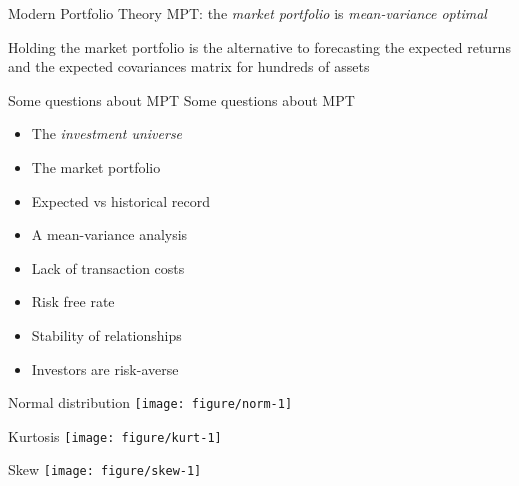 \documentclass[14pt,xcolor=pdftex,dvipsnames,table]{beamer}\usepackage[]{graphicx}\usepackage[]{color}
\makeatletter
\def\maxwidth{ %
  \ifdim\Gin@nat@width>\linewidth
    \linewidth
  \else
    \Gin@nat@width
  \fi
}
\newenvironment{knitrout}{}{} %
\makeatother
\begin{document}
\begin{frame}{Modern Portfolio Theory}
MPT: the \emph{market portfolio} is \emph{mean-variance optimal}
\pause
\vspace{1cm}
\begin{block}{}
Holding the market portfolio is the alternative to forecasting the expected returns and the expected covariances matrix for hundreds of assets
\end{block}
\end{frame}

\begin{frame}{Some questions about MPT}
Some questions about MPT
\begin{itemize}[<+-| alert@+>]
\pause
\item The \emph{investment universe}
\item The market portfolio
\item Expected vs historical record
\item A mean-variance analysis
\item Lack of transaction costs
\item Risk free rate
\item Stability of relationships
\item Investors are risk-averse
\end{itemize}
\end{frame}

\begin{frame}{Normal distribution}
\begin{knitrout}
\color{fgcolor}
\texttt{[image: figure/norm-1]} 

\end{knitrout}
\end{frame}

\begin{frame}{Kurtosis}
\begin{knitrout}
\color{fgcolor}
\texttt{[image: figure/kurt-1]} 

\end{knitrout}
\end{frame}

\begin{frame}{Skew}
\begin{knitrout}
\color{fgcolor}
\texttt{[image: figure/skew-1]} 

\end{knitrout}
\end{frame}
\end{document}
